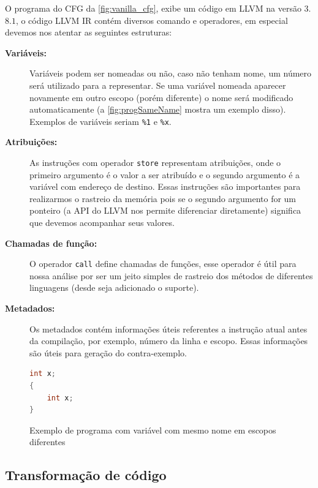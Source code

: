 O programa do CFG da \autoref{fig:vanilla_cfg}, exibe um código em LLVM na versão $3$.$8$.$1$, o código LLVM IR contém diversos comando e operadores, em especial devemos nos atentar as seguintes estruturas:
  \begin{description}
  \item[\textbf{Variáveis:}] Variáveis podem ser nomeadas ou não, caso não tenham nome, um número será utilizado para a representar. Se uma variável nomeada aparecer novamente em outro escopo (porém diferente) o nome será modificado automaticamente (a \autoref{fig:progSameName} mostra um exemplo disso). Exemplos de variáveis seriam \texttt{\%1} e \texttt{\%x}.
  \item[\textbf{Atribuições:}] As instruções com operador \texttt{store} representam atribuições, onde o primeiro argumento é o valor a ser atribuído e o segundo argumento é a variável com endereço de destino. Essas instruções são importantes para realizarmos o rastreio da memória pois se o segundo argumento for um ponteiro (a API do LLVM nos permite diferenciar diretamente) significa que devemos acompanhar seus valores. 
%  
  \item[\textbf{Chamadas de função:}] O operador \texttt{call} define chamadas de funções, esse operador é útil para nossa análise por ser um jeito simples de rastreio dos métodos de diferentes linguagens (desde seja adicionado o suporte).
  \item[\textbf{Metadados:}] Os metadados contém informações úteis referentes a instrução atual antes da compilação, por exemplo, número da linha e escopo. Essas informações são úteis para geração do contra-exemplo. 
\end{description}

\begin{figure}[htb]
\caption{\label{fig:progSameName} Exemplo de programa com variável com mesmo nome em escopos diferentes}
\begin{center}
\begin{minipage}{0.5\textwidth}
\begin{lstlisting}[language=C]       
int x;
{
    int x;
}  
\end{lstlisting}
\end{minipage}
\end{center}
\end{figure}
\subsection{Transformação de código}

